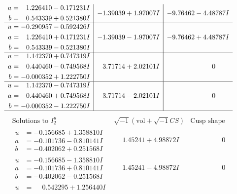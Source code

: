 \documentclass[1p]{elsarticle_modified}
\theoremstyle{definition}
\newcommand{\I}{\sqrt{-1}}
\begin{document}
$$\begin{array}{c|c|c}
\begin{aligned}
a &= \phantom{-}1.226410 - 0.171231 I \\
b &= \phantom{-}0.543339 + 0.521380 I\end{aligned}
 & -1.39039 + 1.97007 I & -9.76462 - 4.48787 I \\ \hline\begin{aligned}
u &= -0.290957 - 0.592426 I \\
a &= \phantom{-}1.226410 + 0.171231 I \\
b &= \phantom{-}0.543339 - 0.521380 I\end{aligned}
 & -1.39039 - 1.97007 I & -9.76462 + 4.48787 I \\ \hline\begin{aligned}
u &= \phantom{-}1.142370 + 0.747319 I \\
a &= \phantom{-}0.440460 - 0.749568 I \\
b &= -0.000352 + 1.222750 I\end{aligned}
 & \phantom{-}3.71714 + 2.02101 I & \phantom{-0.000000 } 0 \\ \hline\begin{aligned}
u &= \phantom{-}1.142370 - 0.747319 I \\
a &= \phantom{-}0.440460 + 0.749568 I \\
b &= -0.000352 - 1.222750 I\end{aligned}
 & \phantom{-}3.71714 - 2.02101 I & \phantom{-0.000000 } 0\\
 \hline 
 \end{array}$$\newpage$$\begin{array}{c|c|c}  
\text{Solutions to }I^u_{2}& \I (\text{vol} + \sqrt{-1}CS) & \text{Cusp shape}\\
 \hline 
\begin{aligned}
u &= -0.156685 + 1.358810 I \\
a &= -0.101736 - 0.810141 I \\
b &= -0.402062 + 0.251568 I\end{aligned}
 & \phantom{-}1.45241 + 4.98872 I & \phantom{-0.000000 } 0 \\ \hline\begin{aligned}
u &= -0.156685 - 1.358810 I \\
a &= -0.101736 + 0.810141 I \\
b &= -0.402062 - 0.251568 I\end{aligned}
 & \phantom{-}1.45241 - 4.98872 I & \phantom{-0.000000 } 0 \\ \hline\begin{aligned}
u &= \phantom{-}0.542295 + 1.256440 I \\

\end{aligned}
\end{array}$$
\end{document}
